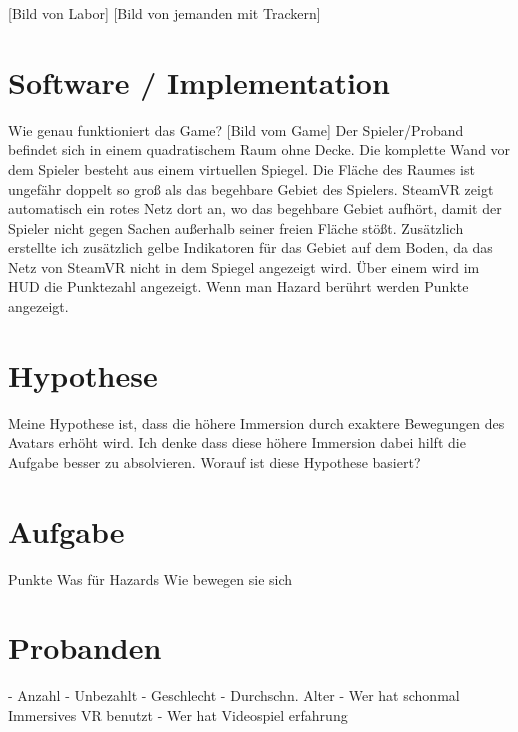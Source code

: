 [Bild von Labor] [Bild von jemanden mit Trackern]

\section{Software / Implementation}
Wie genau funktioniert das Game?
[Bild vom Game]
Der Spieler/Proband befindet sich in einem quadratischem Raum ohne Decke. Die komplette Wand vor dem Spieler besteht aus einem virtuellen Spiegel. Die Fläche des Raumes ist ungefähr doppelt so groß als das begehbare Gebiet des Spielers. SteamVR zeigt automatisch ein rotes Netz dort an, wo das begehbare Gebiet aufhört, damit der Spieler nicht gegen Sachen außerhalb seiner freien Fläche stößt. Zusätzlich erstellte ich zusätzlich gelbe Indikatoren für das Gebiet auf dem Boden, da das Netz von SteamVR nicht in dem Spiegel angezeigt wird.
Über einem wird im HUD die Punktezahl angezeigt. Wenn man Hazard berührt werden Punkte angezeigt.

\section{Hypothese}
Meine Hypothese ist, dass die höhere Immersion durch exaktere Bewegungen des Avatars erhöht wird. Ich denke dass diese höhere Immersion dabei hilft die Aufgabe besser zu absolvieren.
Worauf ist diese Hypothese basiert?


 
\section{Aufgabe}
 Punkte
 Was für Hazards
 Wie bewegen sie sich

\section{Probanden}
- Anzahl
- Unbezahlt
- Geschlecht
- Durchschn. Alter
- Wer hat schonmal Immersives VR benutzt
- Wer hat Videospiel erfahrung

